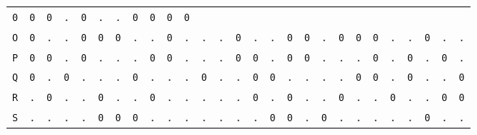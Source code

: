 \begin{figure}[H]
\begin{center}
{\begin{tabular}{c|cccccccccccccccccccccccccc}
        \texttt{0} & \texttt{0} & \texttt{0} & \texttt{.} &
        \texttt{0} & \texttt{.} & \texttt{.} & \texttt{0} &
        \texttt{0} & \texttt{0} & \texttt{0}                             \\
        \texttt{O} & \texttt{0} & \texttt{.} & \texttt{.} &
        \texttt{0} & \texttt{0} & \texttt{0} & \texttt{.} &
        \texttt{.} & \texttt{0} & \texttt{.} & \texttt{.} &
        \texttt{.} & \texttt{0} & \texttt{.} & \texttt{.} &
        \texttt{0} & \texttt{0} & \texttt{.} & \texttt{0} &
        \texttt{0} & \texttt{0} & \texttt{.} & \texttt{.} &
        \texttt{0} & \texttt{.} & \texttt{.}                             \\
        \texttt{P} & \texttt{0} & \texttt{0} & \texttt{.} &
        \texttt{0} & \texttt{.} & \texttt{.} & \texttt{.} &
        \texttt{0} & \texttt{0} & \texttt{.} & \texttt{.} &
        \texttt{.} & \texttt{0} & \texttt{0} & \texttt{.} &
        \texttt{0} & \texttt{0} & \texttt{.} & \texttt{.} &
        \texttt{.} & \texttt{0} & \texttt{.} & \texttt{0} &
        \texttt{.} & \texttt{0} & \texttt{.}                             \\
        \texttt{Q} & \texttt{0} & \texttt{.} & \texttt{0} &
        \texttt{.} & \texttt{.} & \texttt{.} & \texttt{0} &
        \texttt{.} & \texttt{.} & \texttt{.} & \texttt{0} &
        \texttt{.} & \texttt{.} & \texttt{0} & \texttt{0} &
        \texttt{.} & \texttt{.} & \texttt{.} & \texttt{.} &
        \texttt{0} & \texttt{0} & \texttt{.} & \texttt{0} &
        \texttt{.} & \texttt{.} & \texttt{0}                             \\
        \texttt{R} & \texttt{.} & \texttt{0} & \texttt{.} &
        \texttt{.} & \texttt{0} & \texttt{.} & \texttt{.} &
        \texttt{0} & \texttt{.} & \texttt{.} & \texttt{.} &
        \texttt{.} & \texttt{.} & \texttt{0} & \texttt{.} &
        \texttt{0} & \texttt{.} & \texttt{.} & \texttt{0} &
        \texttt{.} & \texttt{.} & \texttt{0} & \texttt{.} &
        \texttt{.} & \texttt{0} & \texttt{0}                             \\
        \texttt{S} & \texttt{.} & \texttt{.} & \texttt{.} &
        \texttt{.} & \texttt{0} & \texttt{0} & \texttt{0} &
        \texttt{.} & \texttt{.} & \texttt{.} & \texttt{.} &
        \texttt{.} & \texttt{.} & \texttt{.} & \texttt{0} &
        \texttt{0} & \texttt{.} & \texttt{0} & \texttt{.} &
        \texttt{.} & \texttt{.} & \texttt{.} & \texttt{.} &
        \texttt{0} & \texttt{.} & \texttt{.}                             \\

\end{tabular}}
\end{center}
\end{figure}
